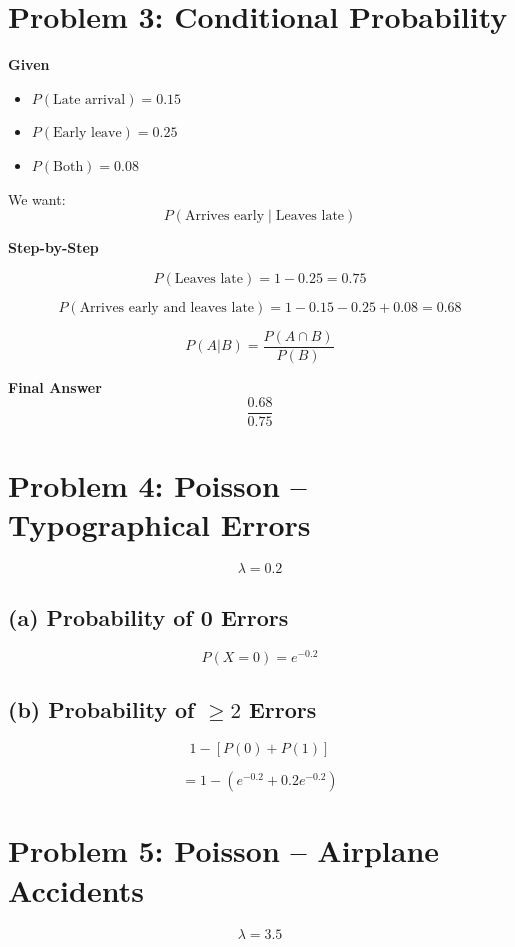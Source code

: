 \documentclass[11pt]{article}
\begin{document}
\section*{Problem 3: Conditional Probability}

\textbf{Given}
\begin{itemize}
    \item $P(\text{Late arrival}) = 0.15$
    \item $P(\text{Early leave}) = 0.25$
    \item $P(\text{Both}) = 0.08$
\end{itemize}

We want:
\[
P(\text{Arrives early} \mid \text{Leaves late})
\]

\textbf{Step-by-Step}

\[
P(\text{Leaves late}) = 1 - 0.25 = 0.75
\]

\[
P(\text{Arrives early and leaves late})
= 1 - 0.15 - 0.25 + 0.08 = 0.68
\]

\[
P(A|B) = \frac{P(A \cap B)}{P(B)}
\]

\textbf{Final Answer}
\[
\boxed{
\frac{0.68}{0.75}
}
\]

\newpage

\section*{Problem 4: Poisson – Typographical Errors}

\[
\lambda = 0.2
\]

\subsection*{(a) Probability of 0 Errors}

\[
P(X=0) = e^{-0.2}
\]

\subsection*{(b) Probability of $\ge 2$ Errors}

\[
1 - [P(0) + P(1)]
\]

\[
= 1 - \left(e^{-0.2} + 0.2e^{-0.2}\right)
\]

\newpage

\section*{Problem 5: Poisson – Airplane Accidents}

\[
\lambda = 3.5
\]
\end{document}
